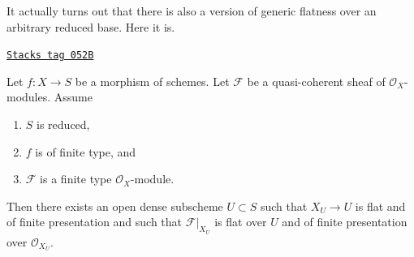 It actually turns out that there is also a version of generic
flatness over an arbitrary reduced base. Here it is.

\begin{proposition}

\label{morphisms-proposition-generic-flatness-reduced}
\href{https://stacks.math.columbia.edu/tag/052B}{\texttt{Stacks tag 052B}}

Let $f : X \to S$ be a morphism of schemes.
Let $\mathcal{F}$ be a quasi-coherent sheaf of $\mathcal{O}_X$-modules.
Assume
\begin{enumerate}
\item $S$ is reduced,
\item $f$ is of finite type, and
\item $\mathcal{F}$ is a finite type $\mathcal{O}_X$-module.
\end{enumerate}
Then there exists an open dense subscheme $U \subset S$ such that
$X_U \to U$ is flat and of finite presentation and such that
$\mathcal{F}|_{X_U}$ is flat over $U$ and of finite presentation
over $\mathcal{O}_{X_U}$.
\end{proposition}

